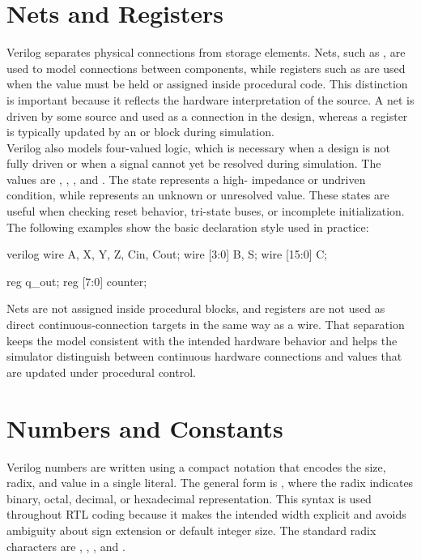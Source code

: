\section{Nets and Registers}

Verilog separates physical connections from storage elements. Nets, such as , are
used to model connections between components, while registers such as  are used when
the value must be held or assigned inside procedural code. This distinction is important because it
reflects the hardware interpretation of the source. A net is driven by some source and used as a
connection in the design, whereas a register is typically updated by an  or
 block during simulation.\\

\noindent Verilog also models four-valued logic, which is necessary when a design is not fully driven
or when a signal cannot yet be resolved during simulation. The values are ,
, , and . The  state represents a high-
impedance or undriven condition, while  represents an unknown or unresolved value.
These states are useful when checking reset behavior, tri-state buses, or incomplete initialization.
The following examples show the basic declaration style used in practice:

\begin{codeblock}{verilog}
wire A, X, Y, Z, Cin, Cout;
wire [3:0] B, S;
wire [15:0] C;

reg q_out;
reg [7:0] counter;
\end{codeblock}

\noindent Nets are not assigned inside procedural blocks, and registers are not used as direct
continuous-connection targets in the same way as a wire. That separation keeps the model consistent
with the intended hardware behavior and helps the simulator distinguish between continuous hardware
connections and values that are updated under procedural control.

\section{Numbers and Constants}

Verilog numbers are written using a compact notation that encodes the size, radix, and value in a
single literal. The general form is , where the radix indicates
binary, octal, decimal, or hexadecimal representation. This syntax is used throughout RTL coding
because it makes the intended width explicit and avoids ambiguity about sign extension or default
integer size. The standard radix characters are , , , and
.\\

